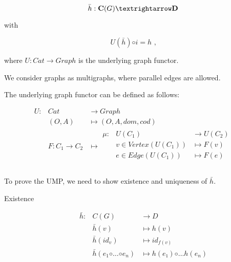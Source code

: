 \documentclass[notitlepage]{article}
\begin{document}
\begin{enumerate}
{$$\bar{h} : \text{\bf C}(G) → \text{\bf D}$$

with

 $$U(\bar{h}) ◦ i = h\text{ ,}$$
 
where $U : Cat → Graph$ is the underlying graph functor.

}

    We consider graphs as multigraphs, where parallel edges are allowed.

    The underlying graph functor can be defined as follows:

    \begin{equation*}
    \begin{array}{rll}
    U : & Cat         & → Graph            \\
        & (O, A)      & \mapsto (O, A, dom, cod) \\
        & F : C_1 → C_2 & \mapsto
            \begin{array}{rll}
              μ : & U(C_1)       & → U(C_2)                 \\
                  & v ∈ Vertex(U(C_1))     & \mapsto F(v)                  \\
                  & e ∈ Edge(U(C_1))       & \mapsto F(e) \\ 
            \end{array}
            \\
    \end{array}
    \end{equation*}

    To prove the UMP, we need to show existence and uniqueness of $\bar{h}$.
    
    \begin{description}
      \item[Existence]

        \begin{equation*}
          \begin{array}{rll}
            \bar{h} : & C(G)    & → D                                     \\
                      & \bar{h}(v)                & \mapsto  h(v)               \\                
                      & \bar{h}(id_v)             & \mapsto  id_{f(v)}            \\                
                      & \bar{h}(e_1 ◦ … ◦ e_n)    & \mapsto  h(e₁) ◦ … h(e_n)    \\                
          \end{array}
        \end{equation*}


\end{description}
\end{enumerate}
\end{document}
